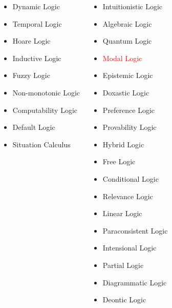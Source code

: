 \documentclass[UTF8,11pt,colorlinks,compress,openany]{beamer}%
\begin{document}
\begin{frame}[shrink]
{\begin{minipage}{1.1\textwidth}
\begin{columns}
\begin{itemize}
						\item Dynamic Logic
						\item Temporal Logic
						\item Hoare Logic
						\item Inductive Logic
						\item Fuzzy Logic
						\item Non-monotonic Logic
						\item Computability Logic
						\item Default Logic
						\item Situation Calculus
					\end{itemize}
					\begin{itemize}
						\item Intuitionistic Logic
						\item Algebraic Logic
						\item Quantum Logic
						\item \textcolor{red}{Modal Logic}
						\item Epistemic Logic
						\item Doxastic Logic
						\item Preference Logic
						\item Provability Logic
						\item Hybrid Logic
						\item Free Logic
						\item Conditional Logic
						\item Relevance Logic
						\item Linear Logic
						\item Paraconsistent Logic
						\item Intensional Logic
						\item Partial Logic
						\item Diagrammatic Logic
						\item Deontic Logic
					\end{itemize}
			\end{columns}
	\end{minipage}}
\end{frame}
\end{document}
